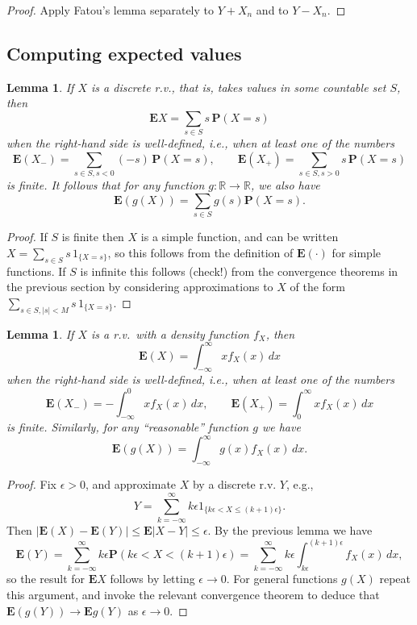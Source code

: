 \documentclass[12pt]{article}
\newtheorem{lem}[thm]{Lemma}
\newcommand{\R}{\mathbb{R}}
\newcommand{\prob}{\mathbf{P}}
\newcommand{\expec}{\mathbf{E}}
\theoremstyle{example}
\begin{document}
\begin{proof} Apply Fatou's lemma separately to $Y+X_n$ and to $Y-X_n$.
\end{proof}

\subsection{Computing expected values}

\begin{lem}
If $X$ is a discrete r.v., that is, takes values in some countable set $S$, then
$$ \expec X = \sum_{s\in S} s\, \prob(X=s) $$
when the right-hand side is well-defined, i.e., when at least one of the numbers 
$$\expec(X_-)=\sum_{s\in S, s<0} (-s)\,\prob(X=s), \qquad \expec(X_+)= \sum_{s\in S, s>0} s\, \prob(X=s) $$
is finite. It follows that for any function $g:\R\to\R$, we also have
$$ \expec(g(X)) = \sum_{s\in S} g(s) \prob(X=s). $$
\end{lem}

\begin{proof} If $S$ is finite then $X$ is a simple function, and can be written $X=\sum_{s\in S} s\,1_{\{X=s\}}$, so this follows from the definition of $\expec(\cdot)$ for simple functions. If $S$ is infinite this follows (check!) from the convergence theorems in the previous section by considering approximations to $X$ of the form $\sum_{s\in S, |s|<M} s\, 1_{\{X=s\}}$.
\end{proof}

\begin{lem} If $X$ is a r.v.\ with a density function $f_X$, then
$$ \expec(X) = \int_{-\infty}^\infty x f_X(x)\,dx $$
when the right-hand side is well-defined, i.e., when at least one of the numbers
$$ \expec(X_-) = -\int_{-\infty}^0 x f_X(x)\,dx, \qquad \expec(X_+) = \int_0^\infty x f_X(x)\,dx $$
is finite. Similarly, for any ``reasonable'' function $g$ we have
$$ \expec(g(X)) = \int_{-\infty}^\infty g(x) f_X(x)\, dx. $$
\end{lem}

\begin{proof} Fix $\epsilon>0$, and approximate $X$ by a discrete r.v. $Y$, e.g.,
$$
Y = \sum_{k=-\infty}^\infty k\epsilon 1_{\{k\epsilon < X \le (k+1)\epsilon\}}.
$$
Then $|\expec(X)-\expec(Y)| \le \expec|X-Y| \le \epsilon$. By the previous lemma we have
$$ \expec(Y)  = \sum_{k=-\infty}^\infty k\epsilon \prob(k\epsilon<X<(k+1)\epsilon)
=\sum_{k=-\infty}^\infty k\epsilon \int_{k\epsilon}^{(k+1)\epsilon} f_X(x)\,dx, $$
so the result for $\expec X$ follows by letting $\epsilon\to 0$. For general functions $g(X)$ repeat this argument, and invoke the relevant convergence theorem to deduce that $\expec(g(Y))\to \expec g(Y)$ as $\epsilon\to 0$.
\end{proof}
\end{document}
